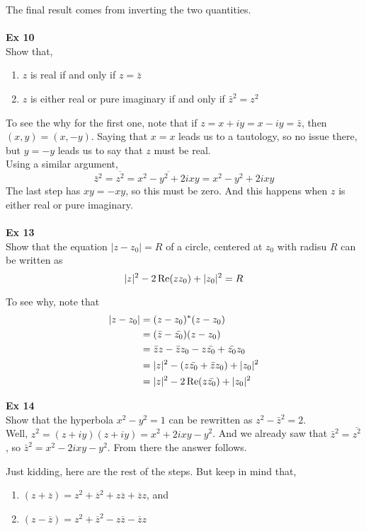 The final result comes from inverting the two quantities.
\\~\\


\textbf{Ex 10}
\\
Show that,
\begin{enumerate}
    \item $z$ is real if and only if $z = \bar{z}$
    \item $z$ is either real or pure imaginary if and only if $\bar{z}^2 = z^2$
\end{enumerate}

To see the why for the first one, note that if $z = x + iy = x - iy = \bar{z}$,
then $(x, y) = (x, -y)$.
Saying that $x = x$ leads us to a tautology, so no issue there, but $y = -y$ leads us to say
that $z$ must be real.
\\

Using a similar argument,
$$
\bar{z}^2 = \overline{z^2} = \overline{x^2 - y^2 + 2ixy} = x^2 - y^2 + 2ixy
$$
The last step has $xy = -xy$, so this must be zero.
And this happens when $z$ is either real or pure imaginary.
\\~\\


\textbf{Ex 13}
\\
Show that the equation $|z - z_0| = R$ of a circle, centered at $z_0$ with radisu $R$
can be written as
$$
|z|^2 - 2\operatorname{Re}(zz_0) + |z_0|^2 = R
$$

To see why, note that
\begin{align*}
|z - z_0| &= (z - z_0)^* (z - z_0) \\
    &= (\bar{z} - \bar{z_0}) (z - z_0) \\
    &= \bar{z}z - \bar{z}z_0 - z\bar{z_0} + \bar{z_0}z_0 \\
    &= |z|^2 - (z\bar{z_0} + \bar{z}z_0) + |z_0|^2 \\
    &= |z|^2 - 2\operatorname{Re}(z\bar{z_0}) + |z_0|^2
\end{align*}


\textbf{Ex 14}
\\
Show that the hyperbola $x^2 - y^2 = 1$ can be rewritten as $z^2 - \bar{z}^2 = 2$.
\\

Well, $z^2 = (z + iy)(z + iy) = x^2 + 2ixy - y^2$.
And we already saw that $\bar{z}^2 = \overline{z^2}$, so $\bar{z}^2 = x^2 - 2ixy - y^2$.
From there the answer follows.

Just kidding, here are the rest of the steps.
But keep in mind that,
\begin{enumerate}
    \item $\left( z + \overline{z} \right) = z^2 + \overline{z}^2 + z\overline{z} + \overline{z}z$, and
    \item $\left( z - \overline{z} \right) = z^2 + \overline{z}^2 - z\overline{z} - \overline{z}z$
\end{enumerate}

